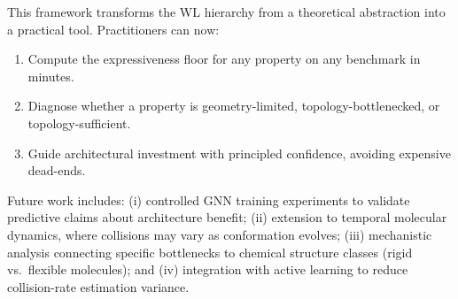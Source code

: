 \documentclass[11pt,letterpaper]{article}
\begin{document}
This framework transforms the WL hierarchy from a theoretical abstraction into a practical tool. Practitioners can now:
\begin{enumerate}
  \item Compute the expressiveness floor for any property on any benchmark in minutes.
  \item Diagnose whether a property is geometry-limited, topology-bottlenecked, or topology-sufficient.
  \item Guide architectural investment with principled confidence, avoiding expensive dead-ends.
\end{enumerate}

Future work includes: (i) controlled GNN training experiments to validate predictive claims about architecture benefit; (ii) extension to temporal molecular dynamics, where collisions may vary as conformation evolves; (iii) mechanistic analysis connecting specific bottlenecks to chemical structure classes (rigid vs.\ flexible molecules); and (iv) integration with active learning to reduce collision-rate estimation variance.



\end{document}
